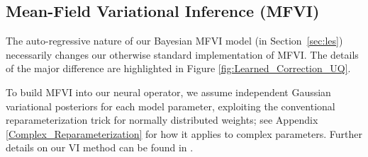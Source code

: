 \subsection{Mean-Field Variational Inference (MFVI)}\label{VI}

The auto-regressive nature of our Bayesian MFVI model (in Section~\ref{sec:les}) necessarily changes our otherwise standard implementation of MFVI. The details of the major difference are highlighted in Figure \ref{fig:Learned_Correction_UQ}.

To build MFVI into our neural operator, we assume independent Gaussian variational posteriors for each model parameter, exploiting the conventional reparameterization trick \cite{kingma2013VAEs} for normally distributed weights; see Appendix \ref{Complex_Reparameterization} for how it applies to complex parameters. Further details on our VI method can be found in \cite{blundell2015weight}.

